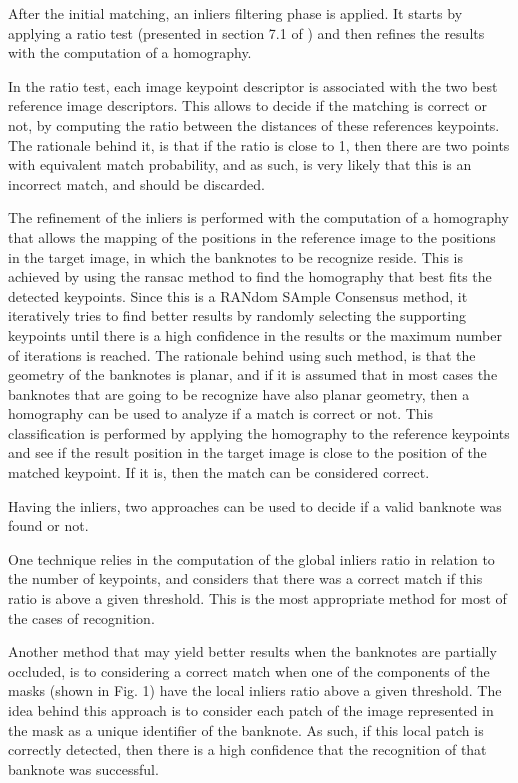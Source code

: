 After the initial matching, an inliers filtering phase is applied. It starts by applying a ratio test (presented in section 7.1 of \cite{Lowe2004}) and then refines the results with the computation of a homography.

In the ratio test, each image keypoint descriptor is associated with the two best reference image descriptors. This allows to decide if the matching is correct or not, by computing the ratio between the distances of these references keypoints. The rationale behind it, is that if the ratio is close to 1, then there are two points with equivalent match probability, and as such, is very likely that this is an incorrect match, and should be discarded.

The refinement of the inliers is performed with the computation of a homography that allows the mapping of the positions in the reference image to the positions in the target image, in which the banknotes to be recognize reside. This is achieved by using the \gls{ransac} \cite{Fischler1981} method to find the homography that best fits the detected keypoints. Since this is a RANdom SAmple Consensus method, it iteratively tries to find better results by randomly selecting the supporting keypoints until there is a high confidence in the results or the maximum number of iterations is reached. The rationale behind using such method, is that the geometry of the banknotes is planar, and if it is assumed that in most cases the banknotes that are going to be recognize have also planar geometry, then a homography can be used to analyze if a match is correct or not. This classification is performed by applying the homography to the reference keypoints and see if the result position in the target image is close to the position of the matched keypoint. If it is, then the match can be considered correct.

Having the inliers, two approaches can be used to decide if a valid banknote was found or not.

One technique relies in the computation of the global inliers ratio in relation to the number of keypoints, and considers that there was a correct match if this ratio is above a given threshold. This is the most appropriate method for most of the cases of recognition.

Another method that may yield better results when the banknotes are partially occluded, is to considering a correct match when one of the components of the masks (shown in Fig. 1) have the local inliers ratio above a given threshold. The idea behind this approach is to consider each patch of the image represented in the mask as a unique identifier of the banknote. As such, if this local patch is correctly detected, then there is a high confidence that the recognition of that banknote was successful.


